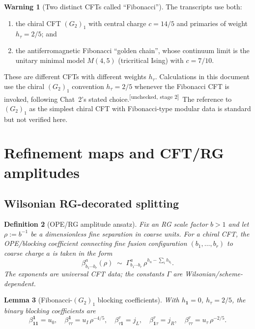 \documentclass[11pt,a4paper]{article}
\newtheorem{definition}{Definition}[section]
\newtheorem{lemma}[definition]{Lemma}
\theoremstyle{definition}
\newtheorem{warning}[definition]{Warning}
\newcommand{\one}{\mathbf{1}}
\newcommand{\unchecked}{\textsuperscript{\textcolor{red!70!black}{[unchecked, stage 2]}}}
\begin{document}
\begin{warning}[Two distinct CFTs called ``Fibonacci'']\label{warn:fibCFTs}
The transcripts use both:
\begin{enumerate}[label=(\alph*)]
\item the chiral CFT $(G_2)_1$ with central charge $c=14/5$ and primaries
of weight $h_\tau = 2/5$; and
\item the antiferromagnetic Fibonacci ``golden chain'', whose continuum
limit is the unitary minimal model $M(4,5)$ (tricritical Ising) with
$c=7/10$.
\end{enumerate}
These are different CFTs with different weights $h_\tau$. Calculations in
this document use the chiral $(G_2)_1$ convention $h_\tau=2/5$ whenever the
Fibonacci CFT is invoked, following Chat~2's stated choice.\unchecked\
The reference to $(G_2)_1$ as the simplest chiral CFT with Fibonacci-type
modular data is standard but not verified here.
\end{warning}

\section{Refinement maps and CFT/RG amplitudes}

\subsection{Wilsonian RG-decorated splitting}

\begin{definition}[OPE/RG amplitude ansatz]\label{def:RG-amp}
Fix an RG scale factor $b>1$ and let $\rho := b^{-1}$ be a dimensionless
fine separation in coarse units. For a chiral CFT, the OPE/blocking
coefficient connecting fine fusion configuration $(b_1,\dots,b_r)$ to coarse
charge $a$ is taken in the form
\[
\beta^{a}_{b_1\cdots b_r}(\rho) \;\sim\; \Gamma^{a}_{b_1\cdots b_r}\,
\rho^{h_a - \sum_i h_{b_i}}.
\]
The exponents are universal CFT data; the constants $\Gamma$ are
Wilsonian/scheme-dependent.
\end{definition}

\begin{lemma}[Fibonacci-$(G_2)_1$ blocking coefficients]\label{lem:fib-beta}
With $h_\one=0$, $h_\tau=2/5$, the binary blocking coefficients are
\[
\beta^{\one}_{\one\one} = u_0,\quad
\beta^{\one}_{\tau\tau} = u_I\,\rho^{-4/5}, \quad
\beta^{\tau}_{\tau\one} = j_L,\quad
\beta^{\tau}_{\one\tau} = j_R,\quad
\beta^{\tau}_{\tau\tau} = u_\tau\,\rho^{-2/5}.
\]
\end{lemma}
\end{document}
